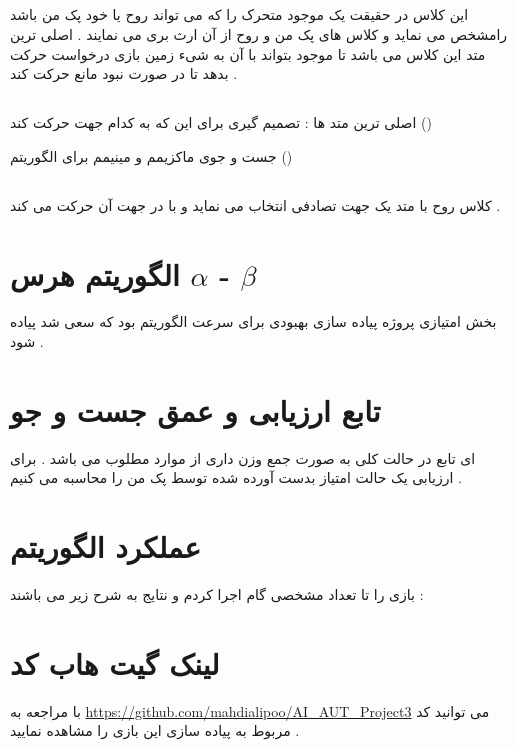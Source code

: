 \subsection{}
این کلاس در حقیقت یک موجود متحرک را که می تواند روح یا خود پک من باشد رامشخص می نماید و کلاس های پک من و روح از آن ارث بری می نمایند . اصلی ترین متد این کلاس 
می باشد تا موجود بتواند با آن به شیء زمین بازی 
 درخواست حرکت بدهد تا در صورت نبود مانع حرکت کند . 
\subsection{}
اصلی ترین متد ها : تصمیم گیری برای این که به کدام جهت حرکت کند 
 ()

جست و جوی ماکزیمم و مینیمم برای الگوریتم 
 ()

\subsection{}
کلاس روح با متد 
یک جهت تصادفی انتخاب می نماید و با 
در جهت آن حرکت می کند .
\section{الگوریتم هرس $\alpha$ - $\beta$}
بخش امتیازی پروژه پیاده سازی بهبودی برای سرعت الگوریتم بود که سعی شد پیاده شود .
\section{تابع ارزیابی و عمق جست و جو}
ای تابع در حالت کلی به صورت جمع وزن داری از موارد مطلوب می باشد . برای ارزیابی یک حالت امتیاز بدست آورده شده توسط پک من را محاسبه می کنیم .
\section{عملکرد الگوریتم}
بازی را تا تعداد مشخصی گام اجرا کردم و نتایج به شرح زیر می باشند :
\section{لینک گیت هاب کد}
با مراجعه به 
\url{https://github.com/mahdialipoo/AI_AUT_Project3}
می توانید کد مربوط به پیاده سازی این بازی را مشاهده نمایید .
